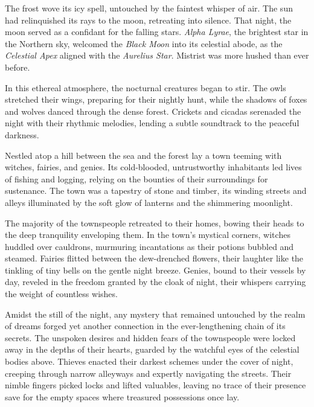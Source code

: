 The frost wove its icy spell, untouched by the faintest whisper of air. The sun had relinquished its rays to the moon, retreating into silence. That night, the moon served as a confidant for the falling stars. \textit{Alpha Lyrae}, the brightest star in the Northern sky, welcomed the \textit{Black Moon} into its celestial abode, as the \textit{Celestial Apex} aligned with the \textit{Aurelius Star}. Mistrist was more hushed than ever before.

In this ethereal atmosphere, the nocturnal creatures began to stir. The owls stretched their wings, preparing for their nightly hunt, while the shadows of foxes and wolves danced through the dense forest. Crickets and cicadas serenaded the night with their rhythmic melodies, lending a subtle soundtrack to the peaceful darkness.

Nestled atop a hill between the sea and the forest lay a town teeming with witches, fairies, and genies. Its cold-blooded, untrustworthy inhabitants led lives of fishing and logging, relying on the bounties of their surroundings for sustenance. The town was a tapestry of stone and timber, its winding streets and alleys illuminated by the soft glow of lanterns and the shimmering moonlight.


The majority of the townspeople retreated to their homes, bowing their heads to the deep tranquility enveloping them. In the town's mystical corners, witches huddled over cauldrons, murmuring incantations as their potions bubbled and steamed. Fairies flitted between the dew-drenched flowers, their laughter like the tinkling of tiny bells on the gentle night breeze. Genies, bound to their vessels by day, reveled in the freedom granted by the cloak of night, their whispers carrying the weight of countless wishes.

Amidst the still of the night, any mystery that remained untouched by the realm of dreams forged yet another connection in the ever-lengthening chain of its secrets. The unspoken desires and hidden fears of the townspeople were locked away in the depths of their hearts, guarded by the watchful eyes of the celestial bodies above. Thieves enacted their darkest schemes under the cover of night, creeping through narrow alleyways and expertly navigating the streets. Their nimble fingers picked locks and lifted valuables, leaving no trace of their presence save for the empty spaces where treasured possessions once lay.


